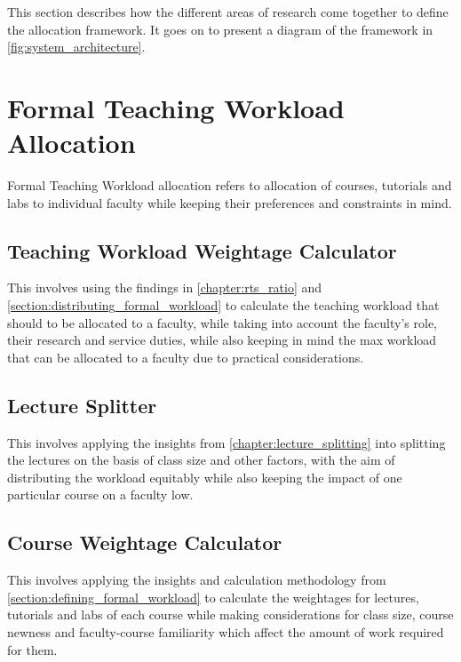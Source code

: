 
This section describes how the different areas of research come together to define the allocation framework. It goes on to present a diagram of the framework in \autoref{fig:system_architecture}.

\section{Formal Teaching Workload Allocation}

Formal Teaching Workload allocation refers to allocation of courses, tutorials and labs to individual faculty while keeping their preferences and constraints in mind.

\subsection{Teaching Workload Weightage Calculator}

This involves using the findings in \autoref{chapter:rts_ratio} and \autoref{section:distributing_formal_workload} to calculate the teaching workload that should to be allocated to a faculty, while taking into account the faculty's role, their research and service duties, while also keeping in mind the max workload that can be allocated to a faculty due to practical considerations.

\subsection{Lecture Splitter}

This involves applying the insights from \autoref{chapter:lecture_splitting} into splitting the lectures on the basis of class size and other factors, with the aim of distributing the workload equitably while also keeping the impact of one particular course on a faculty low.

\subsection{Course Weightage Calculator}

This involves applying the insights and calculation methodology from \autoref{section:defining_formal_workload} to calculate the weightages for lectures, tutorials and labs of each course while making considerations for class size, course newness and faculty-course familiarity which affect the amount of work required for them. 

